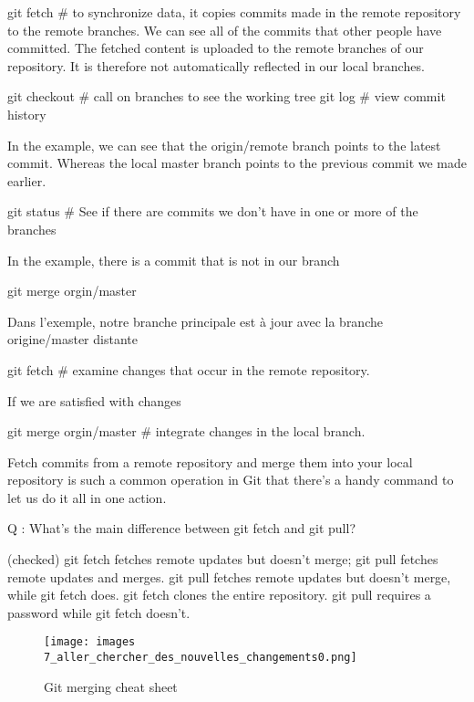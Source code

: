 \documentclass[11pt, onecolumn]{article}
\begin{document}
git fetch   # to synchronize data, it copies commits made in the remote repository to the remote branches. We can see all of the commits that other people have committed. The fetched content is uploaded to the remote branches of our repository. It is therefore not automatically reflected in our local branches.


git checkout   # call on branches to see the working tree
git log     # view commit history

In the example, we can see that the origin/remote branch points to the latest commit. Whereas the local master branch points to the previous commit we made earlier.

git status   # See if there are commits we don't have in one or more of the branches

In the example, there is a commit that is not in our branch

git merge orgin/master

Dans l'exemple, notre branche principale est à jour avec la branche origine/master distante

git fetch      # examine changes that occur in the remote repository.

If we are satisfied with changes

git merge orgin/master    # integrate changes in the local branch.

Fetch commits from a remote repository and merge them into your local repository is such a common operation in Git that there's a handy command to let us do it all in one action.



Q : What’s the main difference between git fetch and git pull?

(checked) git fetch fetches remote updates but doesn't merge; git pull fetches remote updates and merges.
git pull fetches remote updates but doesn't merge, while git fetch does.
git fetch clones the entire repository.
git pull requires a password while git fetch doesn't.

\begin{figure}[h]
\begin{center}
\texttt{[image: images\\7\_aller\_chercher\_des\_nouvelles\_changements0.png]}
\end{center}
\caption{Git merging cheat sheet}
\label{7_aller_chercher_des_nouvelles_changements0}
\end{figure}
\end{document}
